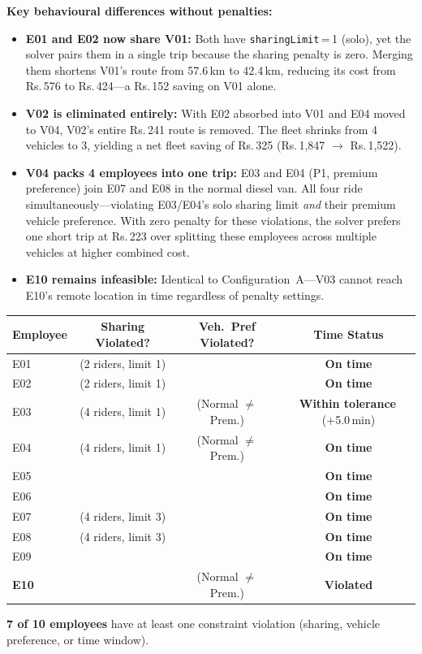 \documentclass[11pt,a4paper]{article}
\newcommand{\rupee}{Rs.}
\newcommand{\code}[1]{\texttt{#1}}
\newcommand{\statusok}{\textcolor{velgreen}{\textbf{On time}}}
\newcommand{\statustol}{\textcolor{velorange}{\textbf{Within tolerance}}}
\newcommand{\statusviol}{\textcolor{velred}{\textbf{Violated}}}
\newcommand{\cmark}{\textcolor{velgreen}{\ding{51}}}
\newcommand{\xmark}{\textcolor{velred}{\ding{55}}}
\begin{document}
\textbf{Key behavioural differences without penalties:}
\begin{itemize}[nosep, leftmargin=1.2em, itemsep=4pt]
    \item \textbf{E01 and E02 now share V01:} Both have \code{sharingLimit}\,=\,1 (solo), yet the solver pairs them in a single trip because the sharing penalty is zero. Merging them shortens V01's route from 57.6\,km to 42.4\,km, reducing its cost from \rupee\,576 to \rupee\,424---a \rupee\,152 saving on V01 alone.
    \item \textbf{V02 is eliminated entirely:} With E02 absorbed into V01 and E04 moved to V04, V02's entire \rupee\,241 route is removed. The fleet shrinks from 4 vehicles to 3, yielding a net fleet saving of \rupee\,325 (\rupee\,1,847 $\to$ \rupee\,1,522).
    \item \textbf{V04 packs 4 employees into one trip:} E03 and E04 (P1, premium preference) join E07 and E08 in the normal diesel van. All four ride simultaneously---violating E03/E04's solo sharing limit \textit{and} their premium vehicle preference. With zero penalty for these violations, the solver prefers one short trip at \rupee\,223 over splitting these employees across multiple vehicles at higher combined cost.
    \item \textbf{E10 remains infeasible:} Identical to Configuration~A---V03 cannot reach E10's remote location in time regardless of penalty settings.
\end{itemize}

\begin{warnbox}
\small
\begin{tabular}{lccc}
\toprule
\textbf{Employee} & \textbf{Sharing Violated?} & \textbf{Veh.\ Pref Violated?} & \textbf{Time Status} \\
\midrule
\rowcolor{rowalt}
E01 & \xmark\;(2 riders, limit 1) & \cmark & \statusok{} \\
E02 & \xmark\;(2 riders, limit 1) & \cmark & \statusok{} \\
\rowcolor{rowalt}
E03 & \xmark\;(4 riders, limit 1) & \xmark\;(Normal $\neq$ Prem.) & \statustol{}\,(+5.0\,min) \\
E04 & \xmark\;(4 riders, limit 1) & \xmark\;(Normal $\neq$ Prem.) & \statusok{} \\
\rowcolor{rowalt}
E05 & \cmark & \cmark & \statusok{} \\
E06 & \cmark & \cmark & \statusok{} \\
\rowcolor{rowalt}
E07 & \xmark\;(4 riders, limit 3) & \cmark & \statusok{} \\
E08 & \xmark\;(4 riders, limit 3) & \cmark & \statusok{} \\
\rowcolor{rowalt}
E09 & \cmark & \cmark & \statusok{} \\
\textbf{E10} & \cmark & \xmark\;(Normal $\neq$ Prem.) & \statusviol{} \\
\bottomrule
\end{tabular}

\vspace{3pt}
\textbf{7 of 10 employees} have at least one constraint violation (sharing, vehicle preference, or time window).
\end{warnbox}
\end{document}
